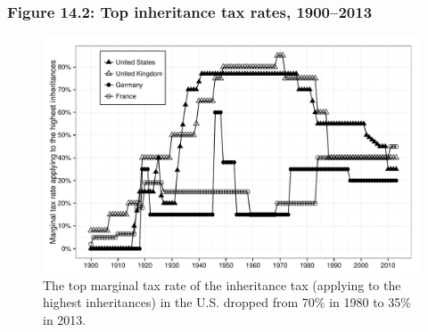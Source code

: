 \documentclass[t]{beamer}\usepackage[]{graphicx}\usepackage[]{color}
\newenvironment{knitrout}{}{} %
\begin{document}
\begin{frame}[label=Figure_14_2]
\frametitle{Figure 14.2: Top inheritance tax rates, 1900--2013}
\begin{figure}[t]
\begin{minipage}[b]{\textwidth}
\centering
\begin{knitrout}\footnotesize
{}\color{fgcolor}

{\centering \includegraphics[width=1\linewidth]{figures/bw/Figure_14_2} 

}



\end{knitrout}
\caption{The top marginal tax rate of the inheritance tax (applying to the highest inheritances) in the U.S. dropped from 70\% in 1980 to 35\% in 2013.}
\end{minipage}
\end{figure}
\end{frame}

\end{document}
